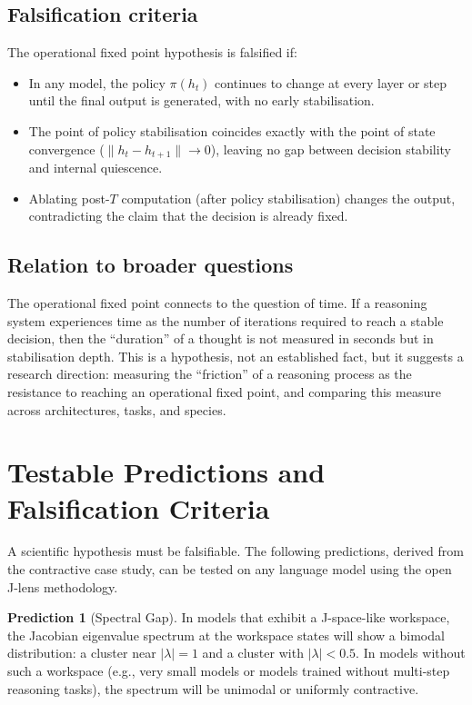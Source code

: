 \documentclass[11pt,a4paper]{article}
\theoremstyle{definition}
\newtheorem{prediction}{Prediction}
\begin{document}
\subsection{Falsification criteria}

The operational fixed point hypothesis is falsified if:
\begin{itemize}
    \item In any model, the policy $\pi(h_t)$ continues to change at every layer
    or step until the final output is generated, with no early stabilisation.
    \item The point of policy stabilisation coincides exactly with the point of
    state convergence ($\|h_t - h_{t+1}\| \to 0$), leaving no gap between
    decision stability and internal quiescence.
    \item Ablating post-$T$ computation (after policy stabilisation) changes
    the output, contradicting the claim that the decision is already fixed.
\end{itemize}

\subsection{Relation to broader questions}

The operational fixed point connects to the question of time. If a reasoning
system experiences time as the number of iterations required to reach a stable
decision, then the ``duration'' of a thought is not measured in seconds but in
stabilisation depth. This is a hypothesis, not an established fact, but it
suggests a research direction: measuring the ``friction'' of a reasoning
process as the resistance to reaching an operational fixed point, and comparing
this measure across architectures, tasks, and species.

\section{Testable Predictions and Falsification Criteria}
\label{sec:testable}

A scientific hypothesis must be falsifiable. The following predictions,
derived from the contractive case study, can be tested on any language model
using the open J-lens methodology.

\begin{prediction}[Spectral Gap]
In models that exhibit a J-space-like workspace, the Jacobian eigenvalue
spectrum at the workspace states will show a bimodal distribution: a cluster
near $|\lambda| = 1$ and a cluster with $|\lambda| < 0.5$. In models without
such a workspace (e.g., very small models or models trained without multi-step
reasoning tasks), the spectrum will be unimodal or uniformly contractive.
\end{prediction}
\end{document}
